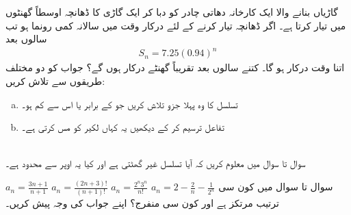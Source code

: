 گاڑیاں بنانے والا ایک کارخانہ دھاتی چادر کو دبا کر ایک گاڑی  کا ڈھانچہ  اوسطاً  گھنٹوں میں تیار کرتا ہے۔ اگر ڈھانچہ تیار کرنے کے لئے درکار وقت میں سالانہ   کمی رونما ہو تب  سالوں بعد
\begin{align*}
S_n=7.25(0.94)^n
\end{align*} 
اتنا وقت درکار ہو گا۔ کتنے سالوں بعد تقریباً  گھنٹے درکار ہوں گے؟ جواب کو دو مختلف طریقوں سے تلاش کریں:
\begin{enumerate}[a.]
\item
تسلسل  کا وہ پہلا جزو تلاش کریں جو  کے برابر یا اس سے کم ہو۔
\item
تفاعل  ترسیم کر کے دیکھیں یہ کہاں لکیر  کو مس کرتی ہے۔
\end{enumerate}
\\
سوال  تا سوال  میں معلوم کریں کہ آیا تسلسل غیر گھٹتی ہے اور کیا یہ اوپر سے محدود ہے۔

$a_n=\frac{3n+1}{n+1}$
$a_n=\frac{(2n+3)!}{(n+1)!}$
$a_n=\frac{2^n3^n}{n!}$
$a_n=2-\frac{2}{n}-\frac{1}{2^n}$
سوال  تا سوال  میں کون سی ترتیب مرتکز ہے اور کون سی منفرج؟ اپنے جواب کی وجہ پیش کریں۔

